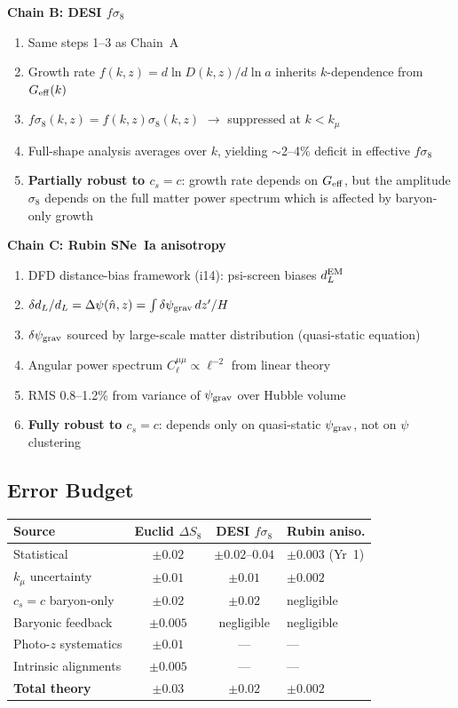 \documentclass[11pt,a4paper]{article}
\newcommand{\kmu}{k_\mu}
\newcommand{\Geff}{G_{\rm eff}}
\begin{document}
\textbf{Chain B: DESI $f\sigma_8$}
\begin{enumerate}[nosep]
\item Same steps 1--3 as Chain~A
\item Growth rate $f(k,z) = d\ln D(k,z)/d\ln a$ inherits
  $k$-dependence from $\Geff(k)$
\item $f\sigma_8(k,z) = f(k,z)\sigma_8(k,z)$ $\to$ suppressed at
  $k < \kmu$
\item Full-shape analysis averages over $k$, yielding $\sim$2--4\%
  deficit in effective $f\sigma_8$
\item \textbf{Partially robust to $c_s = c$}: growth rate depends on
  $\Geff$, but the amplitude $\sigma_8$ depends on the full matter
  power spectrum which is affected by baryon-only growth
\end{enumerate}

\textbf{Chain C: Rubin SNe~Ia anisotropy}
\begin{enumerate}[nosep]
\item DFD distance-bias framework (i14): psi-screen biases $d_L^{\rm EM}$
\item $\delta d_L/d_L = \Delta\psi(\hat{n},z) = \int \delta\psi_{\rm grav}
  \,dz'/H$
\item $\delta\psi_{\rm grav}$ sourced by large-scale matter distribution
  (quasi-static equation)
\item Angular power spectrum $C_\ell^{\mu\mu} \propto \ell^{-2}$
  from linear theory
\item RMS 0.8--1.2\% from variance of $\psi_{\rm grav}$
  over Hubble volume
\item \textbf{Fully robust to $c_s = c$}: depends only on quasi-static
  $\psi_{\rm grav}$, not on $\psi$ clustering
\end{enumerate}

\subsection{Error Budget}

\begin{center}
\begin{tabular}{lccl}
\toprule
\textbf{Source} & \textbf{Euclid $\Delta S_8$} & \textbf{DESI $f\sigma_8$}
  & \textbf{Rubin aniso.} \\
\midrule
Statistical & $\pm 0.02$ & $\pm 0.02$--$0.04$ & $\pm 0.003$ (Yr~1) \\
$\kmu$ uncertainty & $\pm 0.01$ & $\pm 0.01$ & $\pm 0.002$ \\
$c_s = c$ baryon-only & $\pm 0.02$ & $\pm 0.02$ & negligible \\
Baryonic feedback & $\pm 0.005$ & negligible & negligible \\
Photo-$z$ systematics & $\pm 0.01$ & --- & --- \\
Intrinsic alignments & $\pm 0.005$ & --- & --- \\
\midrule
\textbf{Total theory} & $\pm 0.03$ & $\pm 0.02$ & $\pm 0.002$ \\
\bottomrule
\end{tabular}
\end{center}
\end{document}
